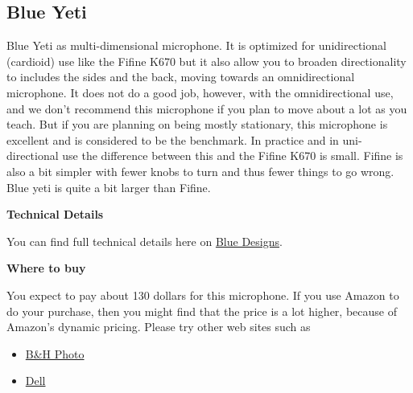 \subsection{Blue Yeti}

\begin{gram}
%
Blue Yeti as multi-dimensional microphone.
%
It is optimized for unidirectional (cardioid) use like the Fifine K670
but it also allow you to broaden directionality to includes the sides
and the back, moving towards an omnidirectional microphone.
%
It does not do a good job, however, with the omnidirectional use, and we don't recommend this microphone if you plan to move about a lot as you teach.
%
But if you are planning on being mostly stationary, this microphone is excellent and is considered to be the benchmark.
%
In practice and in uni-directional use the difference between this and
the Fifine K670 is small.  Fifine is also a bit simpler with fewer knobs to turn and thus fewer things to go wrong.  Blue yeti is quite a bit larger than Fifine.


\textbf{Technical Details}

You can find full technical details here on \href{https://www.bluedesigns.com/products/yeti/}{Blue Designs}.


\textbf{Where to buy}

You expect to pay about 130 dollars for this microphone.  If you use Amazon to do your purchase, then you might find that the price is a lot higher, because of Amazon's dynamic pricing.  Please try other web sites such as 

\begin{itemize}
\item
\href{
https://www.bhphotovideo.com/c/product/1252288-REG/blue_yeti_whiteout_yeti_usb_microphone_whiteout.html/?ap=y&ap=y&smp=y&smp=y&lsft=BI%
\item 
\href{https://www.dell.com/en-us/shop/blue-microphones-yeti-microphone-usb-aztec-copper/apd/aa829519?gacd=9614064-1012-5761040-0-0&dgc=st&gclid=CjwKCAjwgdX4BRB_EiwAg8O8HUjMAfBK6gO_-L-fdNSOjOlY2YqmqpLKR2qxP7hb-yRx8xlw1bscKBoCk0wQAvD_BwE&gclsrc=aw.ds}{Dell}
\end{itemize}
\end{gram}

\begin{gram}
\end{gram}

